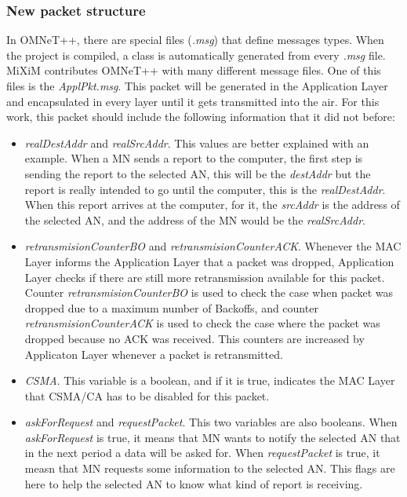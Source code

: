 \subsubsection{New packet structure}

In \ac{OMNeT++}, there are special files (\textit{.msg}) that define messages types. When the project is compiled, a class is automatically 
generated from every \textit{.msg} file. \ac{MiXiM} contributes \ac{OMNeT++} with many different message files. One of this files is the 
\textit{ApplPkt.msg}. This packet will be generated in the Application Layer and encapsulated in every layer until it gets transmitted into the 
air. For this work, this packet should include the following information that it did not before:
\begin{itemize}
 \item \textit{realDestAddr} and \textit{realSrcAddr}. This values are better explained with an example. When a \ac{MN} sends a report to the 
computer, the first step is sending the report to the selected \ac{AN}, this will be the \textit{destAddr} but the report is really intended
to go until the computer, this is the \textit{realDestAddr}. When this report arrives at the computer, for it, the \textit{srcAddr} is the 
address of the selected \ac{AN}, and the address of the \ac{MN} would be the \textit{realSrcAddr}.
 \item \textit{retransmisionCounterBO} and \textit{retransmisionCounterACK}. Whenever the \ac{MAC} Layer informs the Application Layer that a 
packet was dropped, Application Layer checks if there are still more retransmission available for this packet. Counter
\textit{retransmisionCounterBO} is used to check the case when packet was dropped due to a maximum number of Backoffs, and counter 
\textit{retransmisionCounterACK} is used to check the case where the packet was dropped because no \ac{ACK} was received. This counters are
increased by Applicaton Layer whenever a packet is retransmitted.
 \item \textit{CSMA}. This variable is a boolean, and if it is true, indicates the \ac{MAC} Layer that \ac{CSMA/CA} has to be disabled for 
this packet.
 \item \textit{askForRequest} and \textit{requestPacket}. This two variables are also booleans. When \textit{askForRequest} is true, it means
that \ac{MN} wants to notify the selected \ac{AN} that in the next period a data will be asked for. When \textit{requestPacket} is true, it
measn that \ac{MN} requests some information to the selected \ac{AN}. This flags are here to help the selected \ac{AN} to know what kind of 
report is receiving.
\end{itemize}

